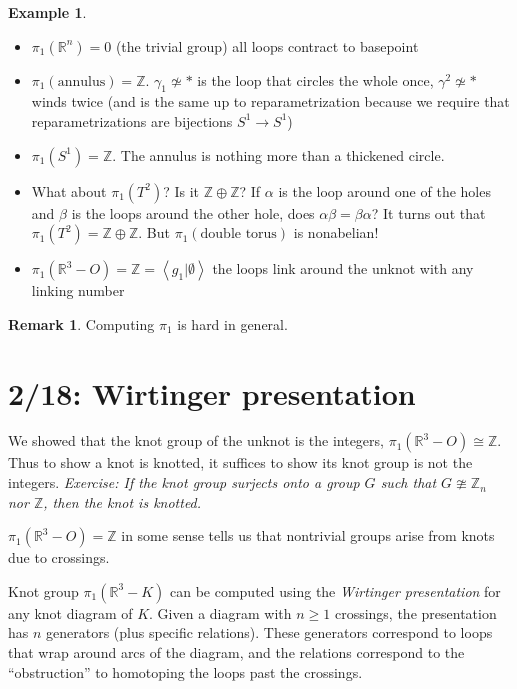 \documentclass[11pt]{article}
\newcommand{\Z}{\mathbb{Z}}
\newcommand{\R}{\mathbb{R}}
\newcommand{\gen}[1]{\left\langle #1 \right\rangle}
\theoremstyle{plain}
\theoremstyle{definition}
\newtheorem{remark}{Remark}
\newtheorem{ex}{Example}
\begin{document}
\begin{ex}

  \begin{itemize}
    \item $\pi_1(\R^n) = 0$ (the trivial group) all loops contract to basepoint
    \item $\pi_1(\text{annulus}) = \Z$. $\gamma_1 \not \simeq \ast$ is the loop that circles the whole once, $\gamma^2 \not \simeq \ast$ winds twice (and is the same
      up to reparametrization because we require that reparametrizations are bijections  $S^1 \to S^1$)
    \item $\pi_1(S^1) = \Z$. The annulus is nothing more than a thickened circle.
    \item What about $\pi_1(T^2)$? Is it $\Z \oplus \Z$? If $\alpha$ is the loop around one of the holes and $\beta$ is the loops around the other hole,
      does $\alpha \beta = \beta \alpha$? It turns out that $\pi_1(T^2) = \Z \oplus \Z$. But $\pi_1(\text{double torus})$ is nonabelian!
    \item $\pi_1(\R^3 - O) = \Z = \gen{g_1 | \emptyset}$ the loops link around the unknot with any linking number
  \end{itemize}

\end{ex}

\begin{remark}
Computing $\pi_1$ is hard in general.
\end{remark}


\clearpage
\section{2/18: Wirtinger presentation}

We showed that the knot group of the unknot is the integers, $\pi_1(\R^3-O)\cong\Z$. Thus to show a knot is knotted, it suffices to show its knot group is not the integers. \textit{Exercise: If the knot group surjects onto a group $G$ such that $G\ncong \Z_n$ nor $\Z$, then the knot is knotted.}

$\pi_1(\R^3 - O) = \Z$ in some sense tells us that nontrivial groups arise from knots due to crossings.

Knot group $\pi_1(\R^3-K)$ can be computed using the \textit{Wirtinger presentation} for any knot diagram of $K$. Given a diagram with $n\ge1$ crossings, the presentation has $n$ generators (plus specific relations). These generators correspond to loops that wrap around arcs of the diagram, and the relations correspond to the ``obstruction'' to homotoping the loops past the crossings.
\end{document}
